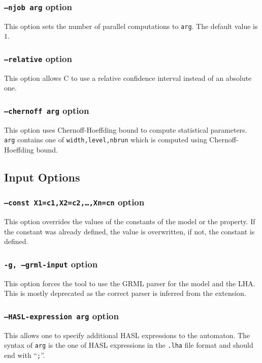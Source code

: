 \documentclass{article}
\newcommand{\cosmos}{\mbox{\textup{C}\scalebox{0.75}{{\textsc{OSMOS}}}}}
\begin{document}
\subsubsection{\texttt{--njob arg}  option}
This option sets the number of parallel computations to \texttt{arg}.
The default value is $1$.

\subsubsection{\texttt{--relative}  option}
This option allows \cosmos{} to use a relative confidence interval
instead of an absolute one.

\subsubsection{\texttt{--chernoff arg}  option}
This option uses Chernoff-Hoeffding bound to compute statistical
parameters.  \texttt{arg} contains one of \texttt{width,level,nbrun}
which is computed using Chernoff-Hoeffding bound.

\subsection{Input Options}

\subsubsection{\texttt{--const X1=c1,X2=c2,\dots,Xn=cn}  option}
This option overrides the values of the constants of the model or the
property. If the constant was already defined, the value is
overwritten, if not, the constant is defined.

\subsubsection{\texttt{-g, --grml-input}  option}
This option forces the tool to use the GRML parser for the model and
the LHA. This is mostly deprecated as the correct parser is inferred
from the extension.

\subsubsection{\texttt{--HASL-expression arg}  option}
This allows one to specify additional HASL{} expressions to the automaton.
The syntax of \texttt{arg} is the one of HASL{} expressions in the
\texttt{.lha} file format and should end with ``\texttt{;}''.
\end{document}

